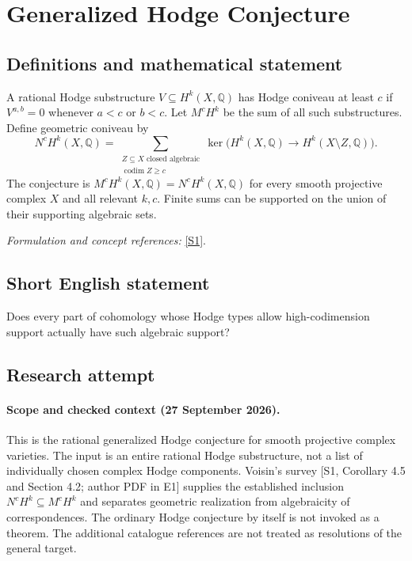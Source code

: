 \documentclass[11pt]{article}
\begin{document}
\section*{\texorpdfstring{Generalized Hodge Conjecture}{Generalized Hodge Conjecture}}\label{statement}
\subsection{Definitions and mathematical statement}
A rational Hodge substructure $V\subseteq H^k(X,{\mathbb{Q}})$ has Hodge coniveau at least $c$ if $V^{a,b}=0$ whenever $a<c$ or $b<c$. Let $M^cH^k$ be the sum of all such substructures. Define geometric coniveau by
\[
 N^cH^k(X,{\mathbb{Q}})=\sum_{\substack{Z\subseteq X\text{ closed algebraic}\\ \operatorname{codim}Z\ge c}}
 \ker\bigl(H^k(X,{\mathbb{Q}})\to H^k(X\setminus Z,{\mathbb{Q}})\bigr).
\]
The conjecture is $M^cH^k(X,{\mathbb{Q}})=N^cH^k(X,{\mathbb{Q}})$ for every smooth projective complex $X$ and all relevant $k,c$. Finite sums can be supported on the union of their supporting algebraic sets.
\par\smallskip\textit{Formulation and concept references:} \href{https://jomprob.org/index.php/jomp/article/view/Vol-1Issue-1Paper-2}{[S1]}.

\subsection{Short English statement}
Does every part of cohomology whose Hodge types allow high-codimension support actually have such algebraic support?
\subsection{Research attempt}

\paragraph{Scope and checked context (27 September 2026).}
This is the rational generalized Hodge conjecture for smooth projective
 complex varieties. The input is an entire rational Hodge substructure,
 not a list of individually chosen complex Hodge components. Voisin's
 survey [S1, Corollary 4.5 and Section 4.2; author PDF in E1] supplies the
 established inclusion $N^cH^k\subseteq M^cH^k$ and separates geometric
 realization from algebraicity of correspondences. The ordinary Hodge
 conjecture by itself is not invoked as a theorem. The additional
 catalogue references are not treated as resolutions of the general target.
\end{document}
